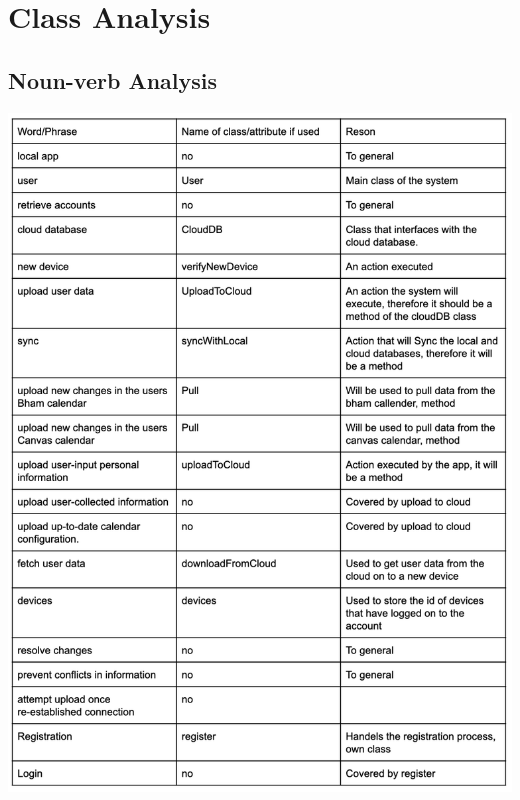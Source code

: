 \documentclass[a4paper,11pt]{article} %
\begin{document}
\section{Class Analysis}
\subsection{Noun-verb Analysis}
\vspace{1cm}
\begin{center}
    \includegraphics[scale=0.9]{img/noun-verb/page1.png}
    \newpage

\end{center}
\end{document}

